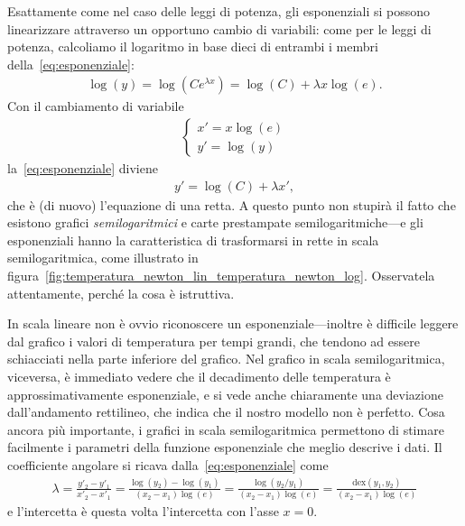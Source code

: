 Esattamente come nel caso delle leggi di potenza, gli esponenziali si possono
linearizzare attraverso un opportuno cambio di variabili: come per le leggi di
potenza, calcoliamo il logaritmo in base dieci di entrambi i membri
della~\eqref{eq:esponenziale}:
\begin{align*}
  \log(y) = \log(Ce^{\lambda x}) = \log(C) + \lambda x\log(e).
\end{align*}
Con il cambiamento di variabile
\begin{align*}
  \begin{cases}
    x' = x \log(e)\\
    y' = \log(y)
  \end{cases}
\end{align*}
la~\eqref{eq:esponenziale} diviene
\begin{align}
  y' = \log(C) + \lambda x',
\end{align}
che \`e (di nuovo) l'equazione di una retta. A questo punto non stupirà il fatto
che esistono grafici \emph{semilogaritmici} e carte prestampate semilogaritmiche---e
gli esponenziali hanno la caratteristica di trasformarsi in rette in scala semilogaritmica,
come illustrato in figura~\ref{fig:temperatura_newton_lin_temperatura_newton_log}.
Osservatela attentamente, perché la cosa \`e istruttiva.


In scala lineare non è ovvio riconoscere un esponenziale---inoltre è difficile
leggere dal grafico i valori di temperatura per tempi grandi, che tendono ad essere
schiacciati nella parte inferiore del grafico. Nel grafico in scala semilogaritmica,
viceversa, è immediato vedere che il decadimento delle temperatura è approssimativamente
esponenziale, e si vede anche chiaramente una deviazione dall'andamento rettilineo,
che indica che il nostro modello non è perfetto. Cosa ancora pi\`u importante,
i grafici in scala semilogaritmica permettono di stimare facilmente i parametri
della funzione esponenziale che meglio descrive i dati.
Il coefficiente angolare si ricava dalla~\eqref{eq:esponenziale} come
\begin{align}\label{eq:fit_grafico_semilog}
  \lambda = \frac{y'_2 - y'_1}{x'_2 - x'_1} =
  \frac{\log(y_2) - \log(y_1)}{(x_2 - x_1)\log(e)} =
  \frac{\log(y_2/y_1)}{(x_2 - x_1)\log(e)} =
  \frac{\text{dex}(y_1, y_2)}{(x_2 - x_1)\log(e)}
\end{align}
e l'intercetta è questa volta l'intercetta con l'asse $x = 0$.

